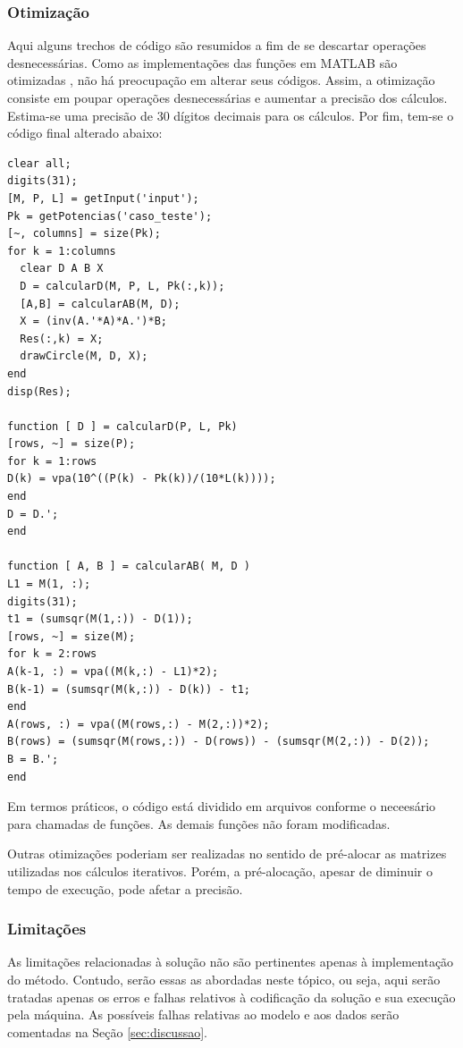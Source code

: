 	\subsubsection{Otimização}
	\label{sec:opt}
	Aqui alguns trechos de código são resumidos a fim de se descartar operações desnecessárias.
	Como as implementações das funções em MATLAB são otimizadas \cite{matlabguide}, não há preocupação
	em alterar seus códigos. Assim, a otimização consiste em poupar operações desnecessárias e aumentar
	a precisão dos cálculos. Estima-se uma precisão de $30$ dígitos decimais para os cálculos. Por fim,
	tem-se o código final alterado abaixo:
	\begin{Verbatim}[fontsize=\footnotesize]
clear all;
digits(31);
[M, P, L] = getInput('input');
Pk = getPotencias('caso_teste');
[~, columns] = size(Pk);
for k = 1:columns
  clear D A B X
  D = calcularD(M, P, L, Pk(:,k));
  [A,B] = calcularAB(M, D);
  X = (inv(A.'*A)*A.')*B;
  Res(:,k) = X;
  drawCircle(M, D, X);
end
disp(Res);

function [ D ] = calcularD(P, L, Pk)
[rows, ~] = size(P);
for k = 1:rows
D(k) = vpa(10^((P(k) - Pk(k))/(10*L(k))));
end
D = D.';
end

function [ A, B ] = calcularAB( M, D )
L1 = M(1, :);
digits(31);
t1 = (sumsqr(M(1,:)) - D(1));
[rows, ~] = size(M);
for k = 2:rows
A(k-1, :) = vpa((M(k,:) - L1)*2);
B(k-1) = (sumsqr(M(k,:)) - D(k)) - t1;
end
A(rows, :) = vpa((M(rows,:) - M(2,:))*2);
B(rows) = (sumsqr(M(rows,:)) - D(rows)) - (sumsqr(M(2,:)) - D(2));
B = B.';
end
	\end{Verbatim}

	Em termos práticos, o código está dividido em arquivos conforme o neceesário para chamadas de funções.
	As demais funções não foram modificadas.

	Outras otimizações poderiam ser realizadas no sentido de pré-alocar as matrizes utilizadas nos cálculos iterativos.
	Porém, a pré-alocação, apesar de diminuir o tempo de execução, pode afetar a precisão.

	\subsubsection{Limitações}
	\label{sec:lim}
	As limitações relacionadas à solução não são pertinentes apenas à implementação do método. Contudo,
	serão essas as abordadas neste tópico, ou seja, aqui serão tratadas apenas os erros e falhas relativos
	à codificação da solução e sua execução pela máquina. As possíveis falhas relativas ao modelo e aos
	dados serão comentadas na Seção \ref{sec:discussao}.

